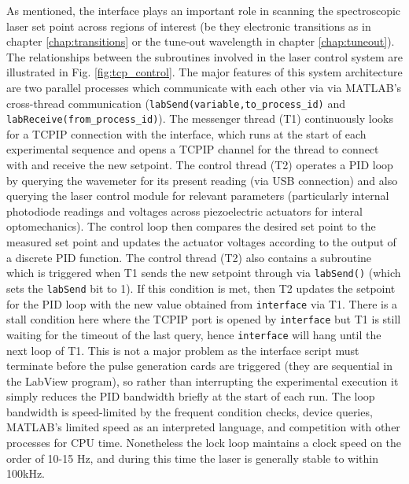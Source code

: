	As mentioned, the interface plays an important role in scanning the spectroscopic laser set point across regions of interest (be they electronic transitions as in chapter \ref{chap:transitions} or the tune-out wavelength in chapter \ref{chap:tuneout}). 
	The relationships between the subroutines involved in the laser control system are illustrated in Fig. \ref{fig:tcp_control}.
	The major features of this system architecture are two parallel processes which communicate with each other via via MATLAB's cross-thread communication (\verb|labSend(variable,to_process_id)| and \verb|labReceive(from_process_id)|).
	The messenger thread (T1) continuously looks for a TCPIP connection with the interface, which runs at the start of each experimental sequence and opens a TCPIP channel for the thread to connect with and receive the new setpoint.
	The control thread (T2) operates a PID loop by querying the wavemeter for its present reading (via USB connection) and also querying the laser control module for relevant parameters (particularly internal photodiode readings and voltages across piezoelectric actuators for interal optomechanics).
	The control loop then compares the desired set point to the measured set point and updates the actuator voltages according to the output of a discrete PID function.
	The control thread (T2) also contains a subroutine which is triggered when T1 sends the new setpoint through via \verb|labSend()| (which sets the \verb|labSend| bit to 1).
	If this condition is met, then T2 updates the setpoint for the PID loop with the new value obtained from \verb|interface| via T1.
	There is a stall condition here where the TCPIP port is opened by \verb|interface| but T1 is still waiting for the timeout of the last query, hence \verb|interface| will hang until the next loop of T1.
	This is not a major problem as the interface script must terminate before the pulse generation cards are triggered (they are sequential in the LabView program), so rather than interrupting the experimental execution it simply reduces the PID bandwidth briefly at the start of each run.
	The loop bandwidth is speed-limited by the frequent condition checks, device queries, MATLAB's limited speed as an interpreted language, and competition with other processes for CPU time. 
	Nonetheless the lock loop maintains a clock speed on the order of 10-15 Hz, and during this time the laser is generally stable to within 100kHz.

	

